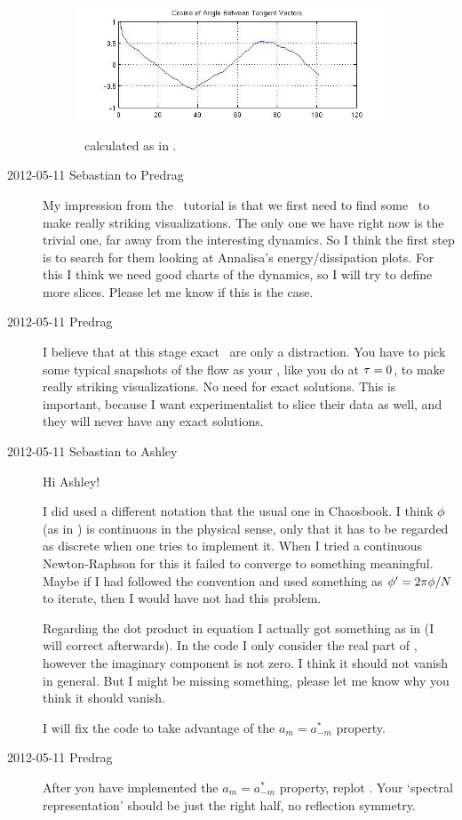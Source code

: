 \begin{description}
\begin{figure}
  \includegraphics[width=0.9\textwidth]{chartBorder1}\\
  \caption{\ChartBord\ calculated as in . }
  \label{f:chartBorder1}
\end{figure}

\item[2012-05-11 Sebastian to Predrag]
My impression from the \statesp\ tutorial is that we first need to find
some \reqva\ to make really striking visualizations. The only
one we have right now is the trivial one, far away from the interesting
dynamics. So I think the first step is to search for them looking at
Annalisa's energy/dissipation plots. For this I think we need good charts
of the dynamics, so I will try to define more slices. Please let me know
if this is the case.

\item[2012-05-11 Predrag] I believe that at this stage exact \reqva\ are
only a distraction. You have to pick some typical snapshots of the flow
as your \templates, like you do at $\tau=0$, to make really striking
visualizations. No need for exact solutions. This is important, because I
want experimentalist to slice their data as well, and they will never
have any exact solutions.

\item[2012-05-11 Sebastian to Ashley]
Hi Ashley!

I did used a different notation that the usual one in Chaosbook. I think
${\bf \phi}$ (as in ) is continuous in the physical sense, only
that it has to be regarded as discrete when one tries to implement it.
When I tried a continuous Newton-Raphson for this it failed to converge
to something meaningful. Maybe if I had followed the convention and used
something as ${\bf \phi}' = 2 \pi {\bf \phi}/N$ to iterate, then I would have
not had this problem.

Regarding the dot product in equation  I actually got
something as in  (I will correct  afterwards).
In the code I only consider the real part of , however the
imaginary component is not zero. I think it should not vanish in general.
But I might be missing something, please let me know why you think it
should vanish.

I will fix the code to take advantage of the $a_m=a^*_{-m}$ property.

\item[2012-05-11 Predrag]
After you have implemented the $a_m=a^*_{-m}$ property, replot
. Your `spectral representation' should be just the
right half, no reflection symmetry.

\end{description}
